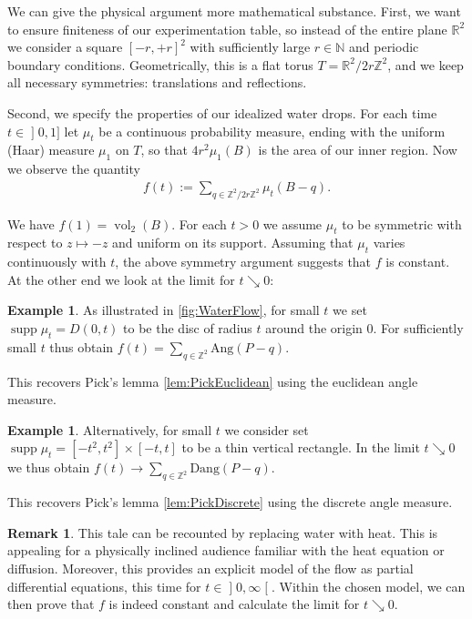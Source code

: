 \documentclass[a4paper]{amsart}
\numberwithin{equation}{section}
\theoremstyle{plain}
\theoremstyle{definition}
\newtheorem{remark}[theorem]{Remark}
\newtheorem{example}[theorem]{Example}
\newcommand{\N}{\mathbb{N}}
\newcommand{\Z}{\mathbb{Z}}
\newcommand{\R}{\mathbb{R}}
\newcommand{\ei}[2]{\mathopen] #1, #2 \mathclose]}
\newcommand{\ee}[2]{\mathopen] #1, #2 \mathclose[}
\DeclareMathOperator{\vol}{vol}
\DeclareMathOperator{\supp}{supp}
\newcommand{\Ang}{\mathrm{Ang}}
\newcommand{\Dang}{\mathrm{Dang}}
\begin{document}
We can give the physical argument more mathematical substance.
%
First, we want to ensure finiteness of our experimentation table,
so instead of the entire plane $\R^2$ we consider a square $[-r,+r]^2$
with sufficiently large $r \in \N$ and periodic boundary conditions.
Geometrically, this is a flat torus $T = \R^2 / 2r\Z^2$,
and we keep all necessary symmetries: translations and reflections.

Second, we specify the properties of our idealized water drops.
For each time $t \in \ei{0}{1}$ let $\mu_t$ be a continuous probability measure,
ending with the uniform (Haar) measure $\mu_1$ on $T$,
so that $4 r^2 \mu_1(B)$ is the area of our inner region. 
Now we observe the quantity 
\begin{align}
  f(t) := \sum_{q \in \Z^2/2r\Z^2} \mu_t(B-q) .
\end{align}

We have $f(1) = \vol_2(B)$.
For each $t > 0$ we assume $\mu_t$ to be symmetric
with respect to $z \mapsto -z$ and uniform on its support.
Assuming that $\mu_t$ varies continuously with $t$,
the above symmetry argument suggests that $f$ is constant.
At the other end we look at the limit for $t \searrow 0$:

\begin{example}
  As illustrated in \autoref{fig:WaterFlow}, for small $t$ %
  we set $\supp \mu_t = D(0,t)$ to be the disc of radius $t$ around the origin $0$.
  For sufficiently small $t$ thus obtain $f(t) = \sum_{q \in \Z^2} \Ang(P-q)$.

  This recovers Pick's lemma \ref{lem:PickEuclidean}
  using the euclidean angle measure.
\end{example}

\begin{example}
  Alternatively, for small $t$ %
  we consider set $\supp \mu_t = [-t^2,t^2] \times [-t,t]$
  to be a thin vertical rectangle.
  In the limit $t \searrow 0$ we thus obtain
  $f(t) \to \sum_{q \in \Z^2} \Dang(P-q)$.

  This recovers Pick's lemma \ref{lem:PickDiscrete}
  using the discrete angle measure.
\end{example}

\begin{remark}
  This tale can be recounted by replacing water with heat.
  This is appealing for a physically inclined audience
  familiar with the heat equation or diffusion.
  Moreover, this provides an explicit model of the flow
  as partial differential equations, this time for $t \in \ee{0}{\infty}$.
  Within the chosen model, we can then 
  prove that $f$ is indeed constant
  and calculate the limit for $t \searrow 0$.
\end{remark}
\end{document}

